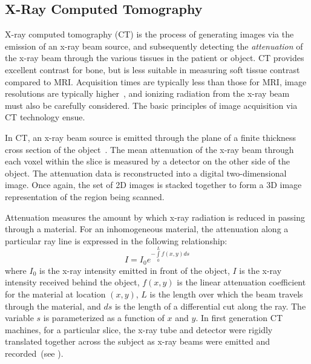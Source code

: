 \subsection{X-Ray Computed Tomography}
\label{X-Ray Computed Tomography}

X-ray computed tomography (CT) is the process of generating images via the emission of an x-ray beam source, and subsequently detecting the \textit{attenuation} of the x-ray beam through the various tissues in the patient or object. CT provides excellent contrast for bone, but is less suitable in measuring soft tissue contrast compared to MRI. Acquisition times are typically less than those for MRI, image resolutions are typically higher~\cite{pomeranz_2007}, and ionizing radiation from the x-ray beam must also be carefully considered. The basic principles of image acquisition via CT technology ensue.

In CT, an x-ray beam source is emitted through the plane of a finite thickness cross section of the object~\cite{mahesh_2002}. The mean attenuation of the x-ray beam through each voxel within the slice is measured by a detector on the other side of the object. The attenuation data is reconstructed into a digital two-dimensional image. Once again, the set of 2D images is stacked together to form a 3D image representation of the region being scanned.

Attenuation measures the amount by which x-ray radiation is reduced in passing through a material. For an inhomogeneous material, the attenuation along a particular ray line is expressed in the following relationship:
\begin{equation}
I= I_0e^{-\int\limits_{0}^{L}f(x,y) ds}
\label{eqn:init}
\end{equation}
where $I_0$ is the x-ray intensity emitted in front of the object, $I$ is the x-ray intensity received behind the object, $f(x,y)$ is the linear attenuation coefficient for the material at location $(x,y)$, $L$ is the length over which the beam travels through the material, and $ds$ is the length of a differential cut along the ray. The variable $s$ is parameterized as a function of $x$ and $y$. In first generation CT machines, for a particular slice, the x-ray tube and detector were rigidly translated together across the subject as x-ray beams were emitted and recorded~(see ).


